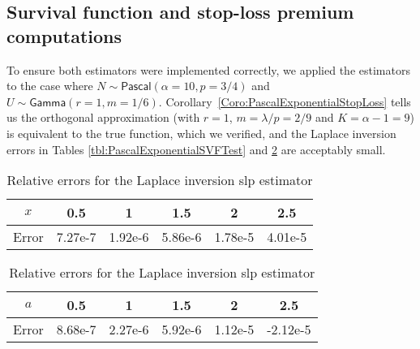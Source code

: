\subsection{Survival function and stop-loss premium computations}

\label{subsec:NumericsSurvivalFunctionStopLoss}

To ensure both estimators were implemented correctly, we applied the estimators to the case where $N\sim\mathsf{Pascal}(\alpha=10,p=3/4)$ and $U\sim\mathsf{Gamma}(r=1,m=1/6)$. Corollary~\ref{Coro:PascalExponentialStopLoss} tells us the orthogonal approximation (with $r=1$, $m=\lambda/p=2/9$ and $K = \alpha-1 = 9$) is equivalent to the true function, which we verified, and the Laplace inversion errors in Tables \ref{tbl:PascalExponentialSVFTest} and \ref{tbl:PascalExponentialSLPTest} are acceptably small.

\begin{table}[H]
\centering
\caption{Relative errors for the Laplace inversion \svf estimator} \vspace{1em}
\begin{tabular}{c|ccccc}
$x$                   & 0.5  & 1  & 1.5  & 2 & 2.5  \\ 
\hline
Error & 7.27e-7 & 1.92e-6 & 5.86e-6 & 1.78e-5 & 4.01e-5 \\
\end{tabular}
\label{tbl:PascalExponentialSVFTest}

\caption{Relative errors for the Laplace inversion slp estimator} \vspace{1em}
\begin{tabular}{c|ccccc}
$a$                   & 0.5  & 1  & 1.5  & 2 & 2.5  \\ 
\hline
Error & 8.68e-7 & 2.27e-6 & 5.92e-6 & 1.12e-5 & -2.12e-5 \\ 
\end{tabular}

\label{tbl:PascalExponentialSLPTest}
\end{table}


